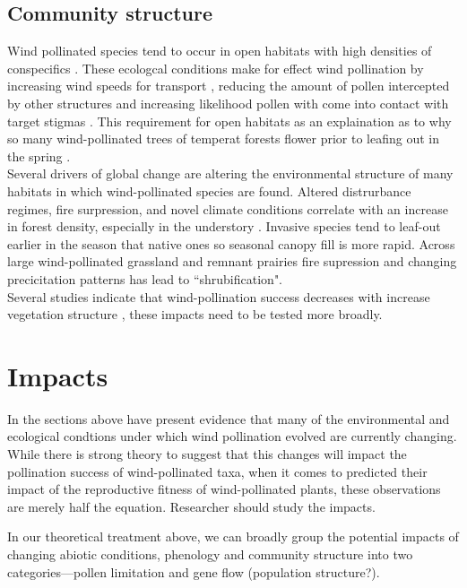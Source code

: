 \documentclass[11pt]{article}
\begin{document}
\subsection*{Community structure}
\noindent Wind pollinated species tend to occur in open habitats with high densities of conspecifics \citep{Regal 1982}. These ecologcal conditions make for effect wind pollination by increasing wind speeds for transport \citep{}, reducing the amount of pollen intercepted by other structures and increasing likelihood pollen with come into contact with target stigmas \citep{}. This requirement for open habitats as an explaination as to why so many wind-pollinated trees of temperat forests flower prior to leafing out in the spring \citep{}. \\

\noindent Several drivers of global change are altering the environmental structure of many habitats in which wind-pollinated species are found. Altered distrurbance regimes, fire surpression, and novel climate conditions correlate with an increase in forest density, especially in the understory \citep{Dolanc:2014aa}. Invasive species tend to leaf-out earlier in the season that native ones so seasonal canopy fill is more rapid. Across large wind-pollinated grassland and remnant prairies fire supression and changing precicitation patterns has lead to ``shrubification".\\

Several studies indicate that wind-pollination success decreases with increase vegetation structure \citep{Mileron2012,Khanduri:2019aa}, these impacts need to be tested more broadly. 

\section{Impacts}
In the sections above have present evidence that many of the environmental and ecological condtions under which wind pollination evolved are currently changing. While there is strong theory to suggest that this changes will impact the pollination success of wind-pollinated taxa, when it comes to predicted their impact of the reproductive fitness of wind-pollinated plants, these observations are merely half the equation. Researcher should study the impacts. 

In our theoretical treatment above, we can broadly group the potential impacts of changing abiotic conditions, phenology and community structure into two categories---pollen limitation and gene flow (population structure?).
\end{document}
